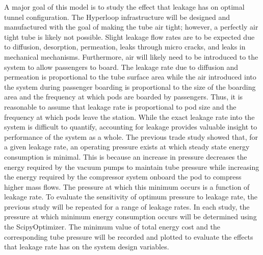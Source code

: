 A major goal of this model is to study the effect that leakage has on optimal
tunnel configuration. The Hyperloop infrastructure will be designed and
manufactured with the goal of making the tube air tight; however, a perfectly
air tight tube is likely not possible. Slight leakage flow rates are to be
expected due to diffusion, desorption, permeation, leaks through micro cracks,
and leaks in mechanical mechanisms. Furthermore, air will likely need to be
introduced to the system to allow passengers to board. The leakage rate due to
diffusion and permeation is proportional to the tube surface area while the air
introduced into the system during passenger boarding is proportional to the
size of the boarding area and the frequency at which pods are boarded by passengers.
Thus, it is reasonable to assume that leakage rate is proportional to pod size
and the frequency at which pods leave the station. While the exact leakage rate
into the system is difficult to quantify, accounting for leakage provides
valuable insight to performance of the system as a whole.
The previous trade study showed that, for a given leakage rate, an operating
pressure exists at which steady state energy consumption is minimal.
This is because an increase in pressure decreases the energy required by the
vacuum pumps to maintain tube pressure while increasing the energy required by
the compressor system onboard the pod to compress higher mass flows.
The pressure at which this minimum occurs is a function of leakage rate.
To evaluate the sensitivity of optimum pressure to leakage rate, the previous
study will be repeated for a range of leakage rates. In each study, the
pressure at which minimum energy consumption occurs will be determined using
the ScipyOptimizer. The minimum value of total energy cost and the
corresponding tube pressure will be recorded and plotted to evaluate the
effects that leakage rate has on the system design variables.

